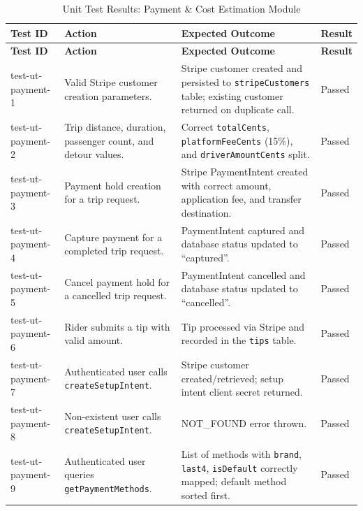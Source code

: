 \small
\begin{longtable}{|p{}|>{\raggedright\arraybackslash}p{}|>{\raggedright\arraybackslash}p{}|p{}|}
\hline
\textbf{Test ID} & \textbf{Action} & \textbf{Expected Outcome} & \textbf{Result} \\
\hline
\endfirsthead

\hline
\textbf{Test ID} & \textbf{Action} & \textbf{Expected Outcome} & \textbf{Result} \\
\hline
\endhead

\hline
\endfoot

\hline
\caption{Unit Test Results: Payment \& Cost Estimation Module}
\endlastfoot

test-ut-payment-1 & Valid Stripe customer creation parameters. & Stripe customer created and persisted to \texttt{stripeCustomers} table; existing customer returned on duplicate call. & Passed \\
\hline
test-ut-payment-2 & Trip distance, duration, passenger count, and detour values. & Correct \texttt{totalCents}, \texttt{platformFeeCents} (15\%), and \texttt{driverAmountCents} split. & Passed \\
\hline
test-ut-payment-3 & Payment hold creation for a trip request. & Stripe PaymentIntent created with correct amount, application fee, and transfer destination. & Passed \\
\hline
test-ut-payment-4 & Capture payment for a completed trip request. & PaymentIntent captured and database status updated to ``captured''. & Passed \\
\hline
test-ut-payment-5 & Cancel payment hold for a cancelled trip request. & PaymentIntent cancelled and database status updated to ``cancelled''. & Passed \\
\hline
test-ut-payment-6 & Rider submits a tip with valid amount. & Tip processed via Stripe and recorded in the \texttt{tips} table. & Passed \\
\hline
test-ut-payment-7 & Authenticated user calls \texttt{createSetupIntent}. & Stripe customer created/retrieved; setup intent client secret returned. & Passed \\
\hline
test-ut-payment-8 & Non-existent user calls \texttt{createSetupIntent}. & NOT\_FOUND error thrown. & Passed \\
\hline
test-ut-payment-9 & Authenticated user queries \texttt{getPaymentMethods}. & List of methods with \texttt{brand}, \texttt{last4}, \texttt{isDefault} correctly mapped; default method sorted first. & Passed \\

\end{longtable}
